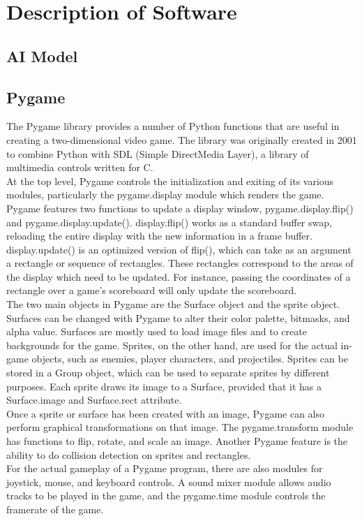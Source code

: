 \chapter{Description of Software}
\section{AI Model}
\section{Pygame}
The Pygame library provides a number of Python functions that are useful in creating a two-dimensional video game. The library was originally created in 2001 to combine Python with SDL (Simple DirectMedia Layer), a library of multimedia controls written for C.\\

At the top level, Pygame controls the initialization and exiting of its various modules, particularly the pygame.display module which renders the game. Pygame features two functions to update a display window, pygame.display.flip() and pygame.display.update(). display.flip() works as a standard buffer swap, reloading the entire display with the new information in a frame buffer. display.update() is an optimized version of flip(), which can take as an argument a rectangle or sequence of rectangles. These rectangles correspond to the areas of the display which need to be updated. For instance, passing the coordinates of a rectangle over a game's scoreboard will only update the scoreboard.\\

The two main objects in Pygame are the Surface object and the sprite object. Surfaces can be changed with Pygame to alter their color palette, bitmasks, and alpha value. Surfaces are mostly used to load image files and to create backgrounds for the game. Sprites, on the other hand, are used for the actual in-game objects, such as enemies, player characters, and projectiles. Sprites can be stored in a Group object, which can be used to separate sprites by different purposes. Each sprite draws its image to a Surface, provided that it has a Surface.image and Surface.rect attribute.\\

Once a sprite or surface has been created with an image, Pygame can also perform graphical transformations on that image. The pygame.transform module has functions to flip, rotate, and scale an image. Another Pygame feature is the ability to do collision detection on sprites and rectangles.\\

For the actual gameplay of a Pygame program, there are also modules for joystick, mouse, and keyboard controls. A sound mixer module allows audio tracks to be played in the game, and the pygame.time module controls the framerate of the game.